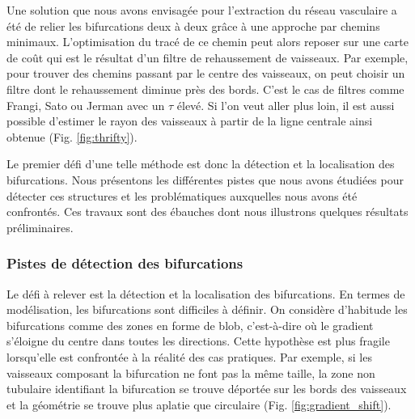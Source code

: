 Une solution que nous avons envisagée pour l'extraction du réseau vasculaire a été de relier les bifurcations deux à deux grâce à une approche par chemins minimaux. L'optimisation du tracé de ce chemin peut alors reposer sur une carte de coût qui est le résultat d'un filtre de rehaussement de vaisseaux. Par exemple, pour trouver des chemins passant par le centre des vaisseaux, on peut choisir un filtre dont le rehaussement diminue près des bords. C'est le cas de filtres comme Frangi, Sato ou Jerman avec un $\tau$ élevé. Si l'on veut aller plus loin, il est aussi possible d'estimer le rayon des vaisseaux à partir de la ligne centrale ainsi obtenue (Fig. \ref{fig:thrifty}).

Le premier défi d'une telle méthode est donc la détection et la localisation des bifurcations. Nous présentons les différentes pistes que nous avons étudiées pour détecter ces structures et les problématiques auxquelles nous avons été confrontés. Ces travaux sont des ébauches dont nous illustrons quelques résultats préliminaires.

\subsubsection{Pistes de détection des bifurcations}

Le défi à relever est la détection et la localisation des bifurcations. En termes de modélisation, les bifurcations sont difficiles à définir. On considère d'habitude les bifurcations comme des zones en forme de blob, c'est-à-dire où le gradient s'éloigne du centre dans toutes les directions. Cette hypothèse est plus fragile lorsqu'elle est confrontée à la réalité des cas pratiques. Par exemple, si les vaisseaux composant la bifurcation ne font pas la même taille, la zone non tubulaire identifiant la bifurcation se trouve déportée sur les bords des vaisseaux et la géométrie se trouve plus aplatie que circulaire (Fig. \ref{fig:gradient_shift}). 

